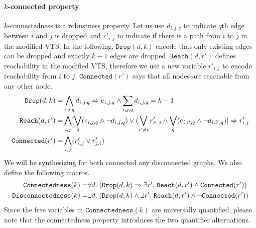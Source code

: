 \paragraph{$k$-connected property}
%
$k$-connectedness is a robustness property.
%
Let us use $d_{i,j,q}$ to indicate $q$th edge between $i$ and $j$ is dropped
and $r'_{i,j}$ to indicate if there is a path from $i$ to $j$ in
the modified VTS.
%
%
In the following, $\texttt{Drop}(d,k)$  encode that only
existing edges can be dropped and exactly $k-1$ edges are dropped.
%
$\texttt{Reach}(d,r')$ defines reachability in the modified VTS,
therefore we use a new variable $r'_{i,j}$ to encode reachability from
$i$ to $j$.
%
$\texttt{Connected}(r')$ says that all nodes are reachable from any
other node.
\begin{align*}
  \texttt{Drop}(d,k) = & 
  \bigwedge\limits_{i,j,q} d_{i,j,q} \Rightarrow e_{i,j,q}  \land 
  \sum_{i,j,q} d_{i,j,q} = k-1\\
  \texttt{Reach}(d,r') = &
  \bigwedge\limits_{i,j}  [\bigvee_{q} (e_{i,j,q} \land  \neg d_{i,j,q}) \lor  (\bigvee_{i' \neq i}  r^{\prime}_{i',j} \land  \bigvee_{q} (e_{i,i',q} \land \neg d_{i,i',q}) ] \Rightarrow r^{\prime}_{i,j}\\
  \texttt{Connected}(r') = & \bigwedge\limits_{i,j} (r^{\prime}_{i,j} \lor r^{\prime}_{j,i})
\end{align*}
We will be synthesizing for both connected any disconnected graphs.
%
We also define the following macros. 
\begin{align*}
  \texttt{Connectedness}(k) = & \forall d.\;
          (\texttt{Drop}(d,k) \Rightarrow \exists r'.\;\texttt{Reach}(d,r')
                                \land \texttt{Connected}(r'))\\
  \texttt{Disconnectedness}(k) = & \exists d.\;
          (\texttt{Drop}(d,k) \land \exists r'.\;\texttt{Reach}(d,r')
                                \land \lnot \texttt{Connected}(r'))
\end{align*}
Since the free variables in $\texttt{Connectedness}(k)$ are universally
quantified, please note that the connectedness property introduces the two
quantifier alternations.
%





